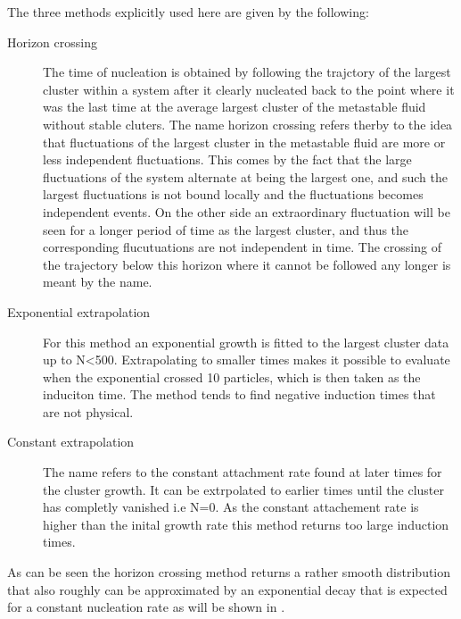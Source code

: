 The three methods explicitly used here are given by the following:
\begin{description}
\item[Horizon crossing]{The time of nucleation is obtained by following the trajctory of the largest cluster within a system after it clearly nucleated back to the point where it was the last time at the average largest cluster of the metastable fluid without stable cluters. The name horizon crossing refers therby to the idea that fluctuations of the largest cluster in the metastable fluid are more or less independent fluctuations. This comes by the fact that the large fluctuations of the system alternate at being the largest one, and such the largest fluctuations is not bound locally and the fluctuations becomes independent events. On the other side an extraordinary fluctuation will be seen for a longer period of time as the largest cluster, and thus the corresponding flucutuations are not independent in time. The crossing of the trajectory below this horizon where it cannot be followed any longer is meant by the name.}

\item[Exponential extrapolation]{For this method an exponential growth is fitted to the largest cluster data up to N<500. Extrapolating to smaller times makes it possible to evaluate when the exponential crossed 10 particles, which is then taken as the induciton time. The method tends to find negative induction times that are not physical.}

\item[Constant extrapolation]{The name refers to the constant attachment rate found at later times for the cluster growth. It can be extrpolated to earlier times until the cluster has completly vanished i.e N=0. As the constant attachement rate is higher than the inital growth rate this method returns too large induction times.}
\end{description}

As can be seen the horizon crossing method returns a rather smooth distribution that also roughly can be approximated by an exponential decay that is expected for a constant nucleation rate as will be shown in .\\



